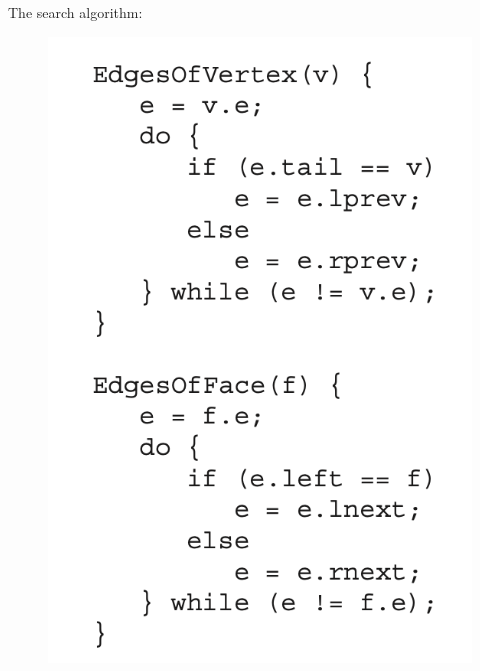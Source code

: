 \documentclass[11pt]{article}
\numberwithin{equation}{section}
\begin{document}
The search algorithm:
\begin{figure}[H]
	\includegraphics[scale=0.5]{p23}
\end{figure}
\end{document}
